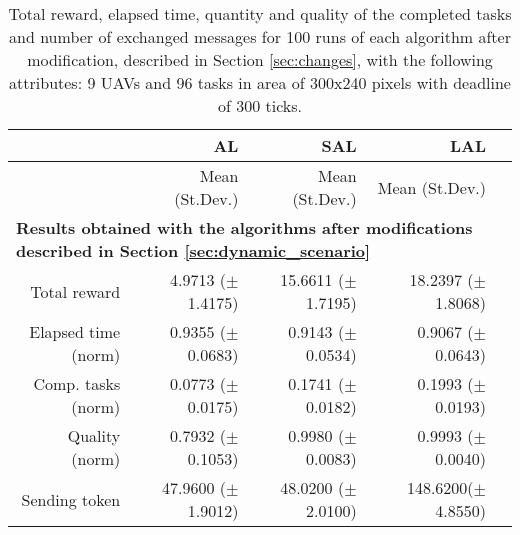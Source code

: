 \begin{table}%
	\small
	\fontsize{6}{6}\selectfont
	\centering
	\caption{Total reward, elapsed time, quantity and quality of the completed tasks and number of exchanged messages for 100 runs of each algorithm after modification, described in Section \ref{sec:changes}, with the following attributes: 9 UAVs and 96 tasks in area of 300x240 pixels with deadline of 300 ticks.}
	\label{table:table02}
	
	\begin{tabular}{rrrrr} \hline
		& AL
		& SAL
		& LAL \\ \hline 
		
		& Mean (St.Dev.)  & Mean (St.Dev.)  & Mean (St.Dev.)  \\ [1ex]
		
		\multicolumn{5}{l}{\textbf{Results obtained with the algorithms after modifications described in Section \ref{sec:dynamic_scenario}}} \\
	Total reward           & 4.9713   ($\pm$1.4175)  & 15.6611  ($\pm$1.7195) & 18.2397 ($\pm$1.8068)   \\
	Elapsed time (norm)    & 0.9355   ($\pm$0.0683)  &  0.9143  ($\pm$0.0534) & 0.9067  ($\pm$0.0643)    \\ 
	Comp. tasks (norm)     & 0.0773   ($\pm$0.0175)  &  0.1741  ($\pm$0.0182) & 0.1993  ($\pm$0.0193)    \\ 
	Quality (norm)         & 0.7932   ($\pm$0.1053)  &  0.9980  ($\pm$0.0083) & 0.9993  ($\pm$0.0040)   \\ 
	Sending token          & 47.9600  ($\pm$1.9012)  &  48.0200 ($\pm$2.0100) & 148.6200($\pm$4.8550)   \\ [1ex]
	
		\hline
	\end{tabular}
\end{table} 
